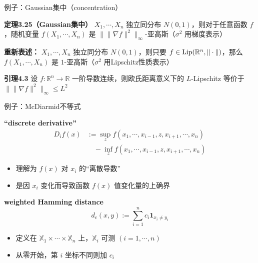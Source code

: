 \documentclass{beamer}
\begin{document}
\begin{frame}{例子：Gaussian集中（concentration）}

\textbf{定理3.25（Gaussian集中）} $X_1, \cdots, X_n$ 独立同分布 $N(0, 1)$，则对于任意函数 $f$，随机变量 $f(X_1, \cdots, X_n)$ 是 $\|\|\nabla f\|^2\|_{\infty}$-亚高斯（$\sigma^2$ 用梯度表示）

\quad

\textbf{重新表述：} $X_1, \cdots, X_n$ 独立同分布 $N(0, 1)$，则只要 $f\in{\rm Lip}(\mathbb{R}^{n}, \|\cdot\|)$，那么$f(X_1, \cdots, X_n)$ 是 $1$-亚高斯（$\sigma^2$ 用Lipschitz性质表示）

\quad

\textbf{引理4.3} 设 $f: \mathbb{R}^n \to \mathbb{R}$ 一阶导数连续，则欧氏距离意义下的 $L$-Lipschitz 等价于 $\|\|\nabla f\|^2\|_{\infty} \le L^2$

\end{frame}

\begin{frame}{例子：McDiarmid不等式}

\textbf{“discrete derivative”}
$$
\begin{aligned}
D_i f(x) &:= \sup_{z} f(x_1,\cdots,x_{i-1},z,x_{i+1},\cdots,x_n) \\
&\quad - \inf_{z} f(x_1,\cdots,x_{i-1},z,x_{i+1},\cdots,x_n)
\end{aligned}
$$

\begin{itemize}
    \item 理解为 $f(x)$ 对 $x_i$ 的“离散导数”
    \item 是因 $x_i$ 变化而导致函数 $f(x)$ 值变化量的上确界
\end{itemize}

\textbf{weighted Hamming distance}
$$
d_c(x, y) := \sum_{i=1}^{n} c_i \mathbf{1}_{x_i\neq y_i}
$$

\begin{itemize}
    \item 定义在 $\mathbb{X}_1\times\cdots\times\mathbb{X}_n$ 上，$\mathbb{X}_i$ 可测 $(i=1,\cdots,n)$
    \item 从零开始，第 $i$ 坐标不同则加 $c_i$
\end{itemize}

\end{frame}
\end{document}
